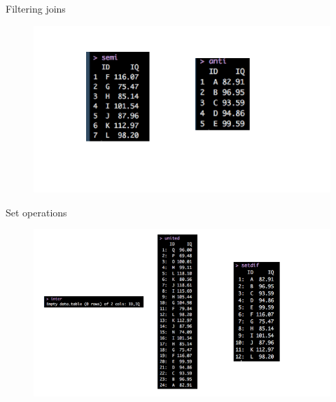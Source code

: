 \documentclass[ignorenonframetext,]{beamer}
\begin{document}
\begin{frame}{Filtering joins}

\begin{figure}
\centering
\includegraphics{graphs/filter.png}
\caption{}
\end{figure}

\end{frame}

\begin{frame}{Set operations}

\begin{figure}
\centering
\includegraphics{graphs/set.png}
\caption{}
\end{figure}

\end{frame}
\end{document}
